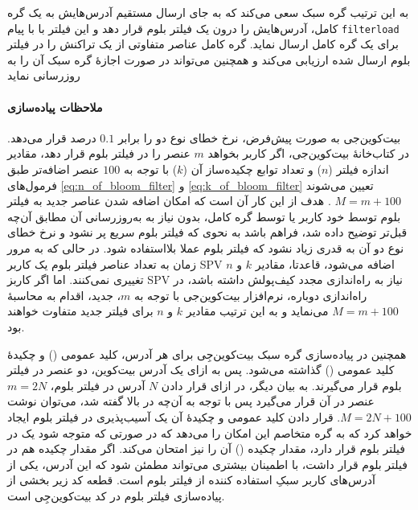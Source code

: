 به این ترتیب گره سبک سعی می‌کند که به جای ارسال مستقیم آدرس‌هایش به یک گره کامل، آدرس‌هایش را درون یک فیلتر بلوم قرار دهد و این فیلتر با با پیام \texttt{filterload} برای یک گره کامل ارسال نماید. گره کامل عناصر متفاوتی از یک تراکنش را در فیلتر بلوم ارسال شده ارزیابی می‌کند و همچنین می‌تواند در صورت اجازهٔ گره سبک آن را به روزرسانی نماید

\paragraph{ملاحظات پیاده‌سازی}
بیت‌کوین‌جی\cite{bitcoinj} به صورت پیش‌فرض، نرخ خطای نوع دو را برابر $0.1$ درصد قرار می‌دهد. در کتاب‌خانهٔ بیت‌کوین‌جی، اگر کاربر بخواهد $m$ عنصر را در فیلتر بلوم قرار دهد، مقادیر اندازه فیلتر ($n$) و تعداد توابع چکیده‌ساز آن ($k$) با توجه به $100$ عنصر اضافه‌تر طبق فرمول‌های \eqref{eq:n_of_bloom_filter} و \eqref{eq:k_of_bloom_filter} تعیین می‌شوند 
$M=m+100$ \cite{Gervais2014}.
 هدف از این کار آن است که امکان اضافه شدن عناصر جدید به فیلتر بلوم توسط خود کاربر یا توسط گره کامل، بدون نیاز به به‌روزرسانی آن مطابق آن‌چه قبل‌تر توضیح داده شد، فراهم باشد به نحوی که فیلتر بلوم سریع پر نشود و نرخ خطای نوع دو آن به قدری زیاد نشود که فیلتر بلوم عملا بلااستفاده شود. در حالی که به مرور زمان به تعداد عناصر فیلتر بلوم یک کاربر SPV اضافه می‌شود، قاعدتا، مقادیر $k$ و $n$ تغییری نمی‌کنند. اما اگر کاربز SPV نیاز به راه‌اندازی مجدد کیف‌پولش داشته باشد، در راه‌اندازی دوباره، نرم‌افزار بیت‌کوین‌جی با توجه به $m$، جدید، اقدام به محاسبهٔ $M=m+100$ می‌نماید و به این ترتیب مقادیر  $k$ و $n$ برای فیلتر جدید متفاوت خواهند بود.
 
همچنین در پیاده‌سازی گره سبک بیت‌کوین‌جِی برای هر آدرس، کلید عمومی () و چکیدهٔ کلید عمومی () گذاشته می‌شود. پس به ازای یک آدرس بیت‌کوین، دو عنصر در فیلتر بلوم قرار می‌گیرند. به بیان دیگر، در ازای قرار دادن $N$ آدرس در فیلتر بلوم، $m=2N$ عنصر در آن قرار می‌گیرد پس با توجه به آن‌چه در بالا گفته شد، می‌توان نوشت $M=2N+100$. قرار دادن کلید عمومی و چکیدهٔ آن یک آسیب‌پذیری در فیلتر بلوم ایجاد خواهد کرد که به گره متخاصم این امکان را می‌دهد که در صورتی که متوجه شود یک  در فیلتر بلوم قرار دارد، مقدار چکیده () آن  را نیز امتحان می‌کند. اگر مقدار چکیده هم در فیلتر بلوم قرار داشت، با اطمینان بیشتری می‌تواند مطمئن شود که این آدرس، یکی از آدرس‌های کاربر سبکِ استفاده کننده از فیلتر بلوم است. قطعه کد زیر بخشی از پیاده‌سازی فیلتر بلوم در کد بیت‌کوین‌جِی است\cite{bitcoinj_BloomFilter}.




